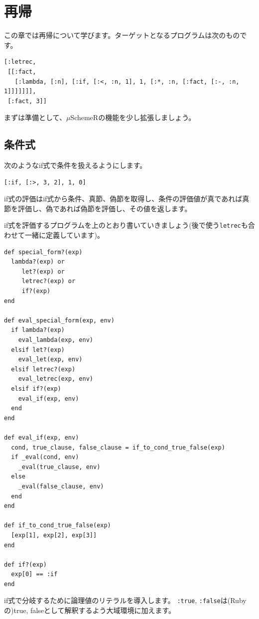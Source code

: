 \chapter{再帰\hspace{-3mm}}

この章では再帰について学びます。ターゲットとなるプログラムは次のものです。

\begin{lstlisting}
[:letrec, 
 [[:fact,
   [:lambda, [:n], [:if, [:<, :n, 1], 1, [:*, :n, [:fact, [:-, :n, 1]]]]]]], 
 [:fact, 3]]
\end{lstlisting}

まずは準備として、$\mu$SchemeRの機能を少し拡張しましょう。

\section{条件式}

次のようなif式で条件を扱えるようにします。

\begin{lstlisting}
[:if, [:>, 3, 2], 1, 0]
\end{lstlisting}

if式の評価はif式から条件、真節、偽節を取得し、条件の評価値が真であれば真節を評価し、偽であれば偽節を評価し、その値を返します。

if式を評価するプログラムを上のとおり書いていきましょう(後で使う{\tt letrec}も合わせて一緒に定義しています)。

\begin{lstlisting}
def special_form?(exp)
  lambda?(exp) or 
     let?(exp) or 
     letrec?(exp) or 
     if?(exp)
end

def eval_special_form(exp, env)
  if lambda?(exp)
    eval_lambda(exp, env)
  elsif let?(exp)
    eval_let(exp, env)
  elsif letrec?(exp)
    eval_letrec(exp, env)
  elsif if?(exp)
    eval_if(exp, env)
  end
end

def eval_if(exp, env)
  cond, true_clause, false_clause = if_to_cond_true_false(exp)
  if _eval(cond, env)
    _eval(true_clause, env)
  else
    _eval(false_clause, env)
  end
end

def if_to_cond_true_false(exp)
  [exp[1], exp[2], exp[3]]
end

def if?(exp)
  exp[0] == :if
end
\end{lstlisting}

if式で分岐するために論理値のリテラルを導入します。
{\tt :true}, {\tt :false}は(Rubyの)true, falseとして解釈するよう大域環境に加えます。

